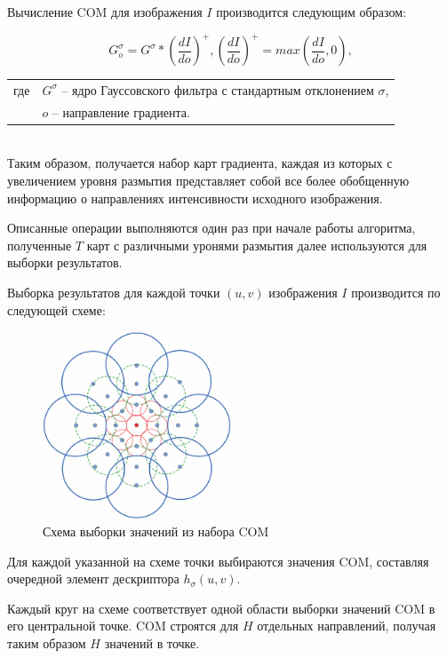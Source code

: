 {{{{		Вычисление COM для изображения $I$ производится следующим образом:
		
		\begin{equation}\label{coms}
		G_o^\sigma = G^\sigma * \left(\dfrac{dI}{do}\right)^+ , \left(\dfrac{dI}{do}\right)^+ = max\left(\dfrac{dI}{do}, 0\right),
		\end{equation}
		\begin{tabular}{ rl }
			\quad \quad где 
			& $ G^\sigma $ -- ядро Гауссовского фильтра с стандартным отклонением $ \sigma $,\\
			& $o$ -- направление градиента.
		\end{tabular}\\
		
		Таким образом, получается набор карт градиента, каждая из которых с увеличением уровня размытия представляет собой все более обобщенную информацию о направлениях интенсивности исходного изображения. 
		
		Описанные операции выполняются один раз при начале работы алгоритма, полученные $T$ карт с различными уронями размытия далее используются для выборки результатов. 
		
		Выборка результатов для каждой точки $(u,v)$ изображения $I$ производится по следующей схеме:
		
		\begin{figure}[H]
			\centering                             
			\includegraphics[width=0.5\textwidth,keepaspectratio]{daisy/DAISY-descriptor-structure.png}   
			\centering\caption{ Схема выборки значений из набора COM }
			\label{daisy_pattern}                           
		\end{figure}    
		
		Для каждой указанной на схеме точки выбираются значения COM, составляя очередной элемент дескриптора $h_\sigma(u,v)$. 
		
	    Каждый круг на схеме соответствует одной области выборки значений COM в его центральной точке. COM строятся для $H$ отдельных направлений, получая таким образом $H$ значений в точке.
		
}}}}
